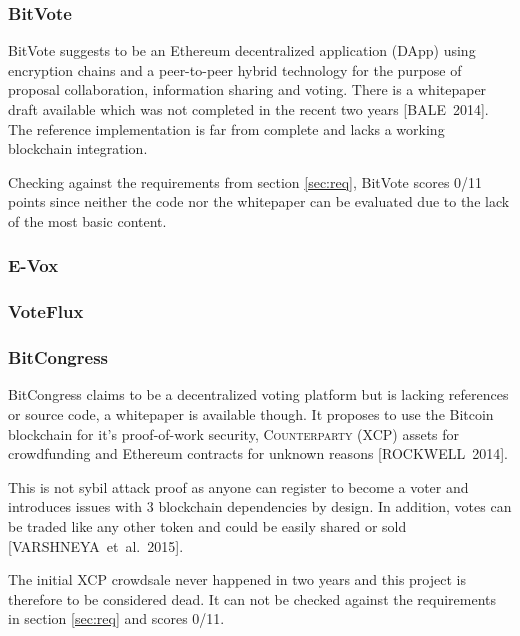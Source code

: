 \documentclass[9pt,oneside]{amsart}
\begin{document}
\begin{multicols}{2}
\subsubsection{BitVote}
BitVote suggests to be an Ethereum decentralized application (DApp) using encryption chains and a peer-to-peer hybrid technology for the purpose of proposal collaboration, information sharing and voting. There is a whitepaper draft available which was not completed in the recent two years [BALE~2014]. The reference implementation is far from complete and lacks a working blockchain integration.\par
Checking against the requirements from section \ref{sec:req}, BitVote scores 0/11 points since neither the code nor the whitepaper can be evaluated due to the lack of the most basic content.

\subsubsection{E-Vox}
\subsubsection{VoteFlux}
\subsubsection{BitCongress}
BitCongress claims to be a decentralized voting platform but is lacking references or source code, a whitepaper is available though. It proposes to use the Bitcoin blockchain for it's proof-of-work security, \textsc{Counterparty (XCP)} assets for crowdfunding and Ethereum contracts for unknown reasons [ROCKWELL~2014].\par
This is not sybil attack proof as anyone can register to become a voter and introduces issues with 3 blockchain dependencies by design. In addition, votes can be traded like any other token and could be easily shared or sold [VARSHNEYA~et~al.~2015].\par
The initial XCP crowdsale never happened in two years and this project is therefore to be considered dead. It can not be checked against the requirements in section \ref{sec:req} and scores 0/11.


\end{multicols}
\end{document}
